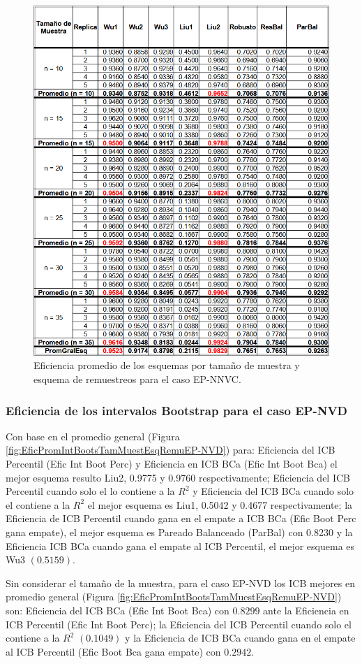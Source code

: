 \begin{figure}[ht] 
	\centering 
	\includegraphics[width=0.70\linewidth]{img/EP_NNVC_Efic_Esq.png} 
	\caption{Eficiencia promedio de los esquemas por tamaño de muestra y esquema de remuestreos para el caso EP-NNVC.} 
	\label{fig:EficPromEsqTamMuesEsqRemuEP-NNVC}
\end{figure}
\FloatBarrier



\subsubsection{Eficiencia de los intervalos Bootstrap para el caso EP-NVD}
Con base en el promedio general (Figura \ref{fig:EficPromIntBootsTamMuestEsqRemuEP-NVD}) para: Eficiencia del ICB Percentil (Efic Int Boot Perc) y Eficiencia en ICB BCa (Efic Int Boot Bca) el mejor esquema resulto Liu2, 0.9775 y 0.9760 respectivamente; Eficiencia del ICB Percentil cuando solo el lo contiene a la $R^{2}$ y Eficiencia del ICB BCa cuando solo el contiene a la $R^{2}$ el mejor esquema es Liu1, 0.5042 y 0.4677 respectivamente; 
la Eficiencia de ICB Percentil cuando gana en el empate a ICB BCa (Efic Boot Perc gana empate), el mejor esquema es Pareado Balanceado (ParBal) con 0.8230 y la Eficiencia ICB BCa cuando gana el empate al ICB Percentil, el mejor esquema es Wu3 $(0.5159)$.
\vspace{.5cm}


Sin considerar el tamaño de la muestra, para el caso EP-NVD los ICB mejores en promedio general (Figura \ref{fig:EficPromIntBootsTamMuestEsqRemuEP-NVD}) son: Eficiencia del ICB BCa (Efic Int Boot Bca) con $0.8299$ ante la Eficiencia en ICB Percentil (Efic Int Boot Perc); la Eficiencia del ICB Percentil cuando solo el contiene a la $R^{2}$ $(0.1049)$ y la Eficiencia de ICB BCa cuando gana en el empate al ICB Percentil (Efic Boot Bca gana empate) con $0.2942$.


